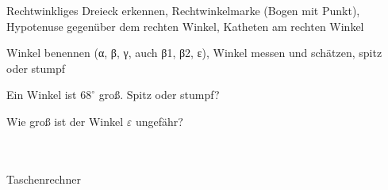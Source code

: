 \setcounter{aufgabe}{0}

\begin{aufgabe}{Rechtwinkliges Dreieck erkennen, Rechtwinkelmarke (Bogen mit Punkt), Hypotenuse gegenüber dem rechten Winkel, Katheten am rechten Winkel}
\end{aufgabe}

\begin{aufgabe}{Winkel benennen (α, β, γ, auch β1, β2, ε), Winkel messen und schätzen, spitz oder stumpf}
\begin{teile}
\teil Ein Winkel ist $68^\circ$ groß. Spitz oder stumpf? \\  
\end{teile}
\begin{teile}
\teil Wie groß ist der Winkel $\varepsilon$ ungefähr? \\  \\  \\ 
\end{teile}
\end{aufgabe}

\begin{aufgabe}{Taschenrechner}
\end{aufgabe}

